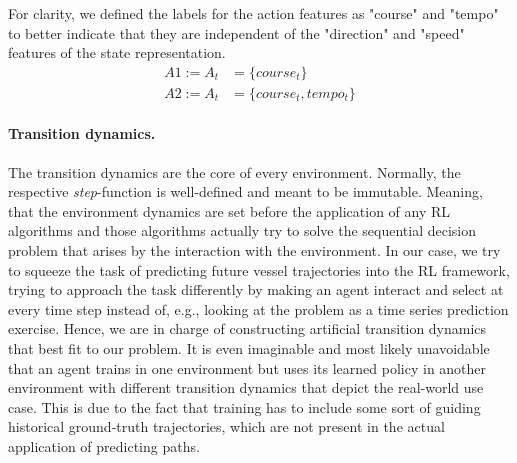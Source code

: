 For clarity, we defined the labels for the action features as "course" and "tempo" to better indicate that they are independent of the "direction" and "speed" features of the state representation.
\begin{equation}
\begin{aligned}
    A1 := A_t &= \{course_t\}
\\
    A2 := A_t &= \{course_t, tempo_t\}
    \end{aligned}
\end{equation}

\paragraph{Transition dynamics.} The transition dynamics are the  core of every environment. Normally, the respective \textit{step}-function is well-defined and meant to be immutable. Meaning, that the environment dynamics are set before the application of any RL algorithms and those algorithms actually try to solve the sequential decision problem that arises by the interaction with the environment. In our case, we try to squeeze the task of predicting future vessel trajectories into the RL framework, trying to approach the task differently by making an agent interact and select at every time step instead of, e.g., looking at the problem as a time series prediction exercise. Hence, we are in charge of constructing artificial transition dynamics that best fit to our problem. It is even imaginable and most likely unavoidable that an agent trains in one environment but uses its learned policy in another environment with different transition dynamics that depict the real-world use case. This is due to the fact that training has to include some sort of guiding historical ground-truth trajectories, which are not present in the actual application of predicting paths.
\par

